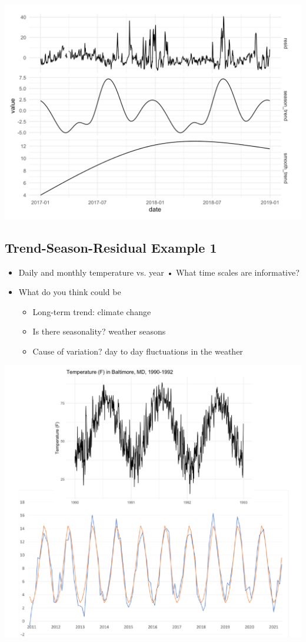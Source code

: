 \documentclass[11pt]{article}
\theoremstyle{definition}
\begin{document}
\includegraphics[width=\textwidth/2]{2.png}

\subsection{Trend-Season-Residual Example 1}
\begin{itemize}
  \item Daily and monthly
  temperature vs. year
  • What time scales are
  informative?
  \item What do you think
  could be
  \begin{itemize}
    \item Long-term trend: climate change
    \item Is there seasonality? weather seasons
    \item Cause of variation? day to day fluctuations in the weather
  \end{itemize}
\end{itemize}

\includegraphics[width=\textwidth/4]{3.png}
\end{document}
